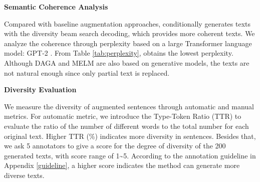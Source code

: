\noindent\textbf{Semantic Coherence Analysis}

Compared with baseline augmentation approaches, {\modelname} conditionally generates texts with the diversity beam search decoding, which provides more coherent texts. We analyze the coherence through perplexity based on a large Transformer language model: GPT-2 \cite{radford2019language}. From Table \ref{tab:perplexity}, {\modelname} obtains the lowest perplexity. Although DAGA and MELM are also based on generative models, the texts are not natural enough since only partial text is replaced.
\begin{table}[t]
\centering
{}
\caption{Diversity Evaluation on three datasets.}
\label{tab:human}
\vspace{-1mm}
\end{table}

\noindent\textbf{Diversity Evaluation}

We measure the diversity of augmented sentences through automatic and manual metrics. For automatic metric, we introduce the Type-Token Ratio (TTR) \cite{tweedie1998variable} to evaluate the ratio of the number of different words to the total number for each original text. Higher TTR (\%) indicates more diversity in sentences. Besides that, we ask 5 annotators to give a score for the degree of diversity of the 200 generated texts, with score range of 1\textasciitilde5. According to the annotation guideline in Appendix \ref{guideline}, a higher score indicates the method can generate more diverse texts. 

